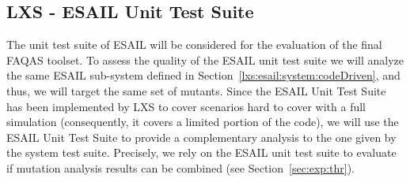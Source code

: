 \subsection{LXS - ESAIL Unit Test Suite}
\label{chapter:caseStudies:LXS:Unit}



The unit test suite of ESAIL will be considered for the evaluation of the final FAQAS toolset.
To assess the quality of the ESAIL unit test suite we will analyze the same ESAIL sub-system defined in Section~\ref{lxs:esail:system:codeDriven}, and thus, we will target the same set of mutants. Since the ESAIL Unit Test Suite has been implemented by LXS to cover scenarios hard to cover with a full simulation (consequently, it covers a limited portion of the code), we will use the ESAIL Unit Test Suite to provide a complementary analysis to the one given by the system test suite.
Precisely, we rely on the ESAIL unit test suite to evaluate if mutation analysis results can be combined (see Section~\ref{sec:exp:thr}).






